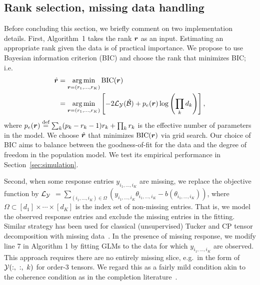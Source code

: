 \documentclass[twoside]{article}
\theoremstyle{plain}
\theoremstyle{definition}
\begin{document}
\subsection{Rank selection, missing data handling}\label{sec:tuning}
Before concluding this section, we briefly comment on two implementation details. First, Algorithm~1 takes the rank $\bm{r}$ as an input. Estimating an appropriate rank given the data is of practical importance. We propose to use Bayesian information criterion (BIC) and choose the rank that minimizes BIC; i.e.
\begin{align}\label{eq:BIC}
\hat {\bm{r}}&=\operatorname*{arg\,min}_{\bm{r}=(r_1,\ldots,r_K)} \text{BIC}(\bm{r})\\
&=\operatorname*{arg\,min}_{\bm{r}=(r_1,\ldots,r_K)}\left[-2\mathcal{L}_{\mathcal{Y}}(\hat {\mathcal{B}})+p_e(\bm{r})\log \left(\prod_k d_k\right) \right],
\end{align}
where $p_e(\bm{r})\stackrel{\text{def}}{=}\sum_k (p_k-r_k-1)r_k+\prod_k r_k$ is the effective number of parameters in the model. We choose $\hat {\bm{r}}$ that minimizes $\text{BIC}(\bm{r})$ via grid search. Our choice of BIC aims to balance between the goodness-of-fit for the data and the degree of freedom in the population model. We test its empirical performance in Section~\ref{sec:simulation}.  

Second, when some response entries $y_{i_1,\ldots,i_K}$ are missing, we replace the objective function by $\mathcal{L}_{\mathcal{Y}}$ $= \sum_{(i_1,\ldots,i_K)\in\Omega}\left(y_{i_1,\ldots,i_K}\theta_{i_1,\ldots,i_K}-b(\theta_{i_1,\ldots,i_K})\right)$, where $\Omega\subset[d_1]\times \cdots \times [d_K]$ is the index set of non-missing entries. That is, we model the observed response entries and exclude the missing entries in the fitting. Similar strategy has been used for classical (unsupervised) Tucker and CP tensor decomposition with missing data~\cite{acar2010scalable,wang2018learning,wang2017tensor}. In the presence of missing response, we modify line 7 in Algorithm 1 by fitting GLMs to the data for which $y_{i_1,\ldots,i_K}$ are observed. This approach requires there are no entirely missing slice, e.g.\ in the form of $\tY(:,\ :,\ k)$ for order-3 tensors. We regard this as a fairly mild condition akin to the coherence condition as in the completion literature~\cite{candes2009exact,ghadermarzy2018learning}.
\end{document}
